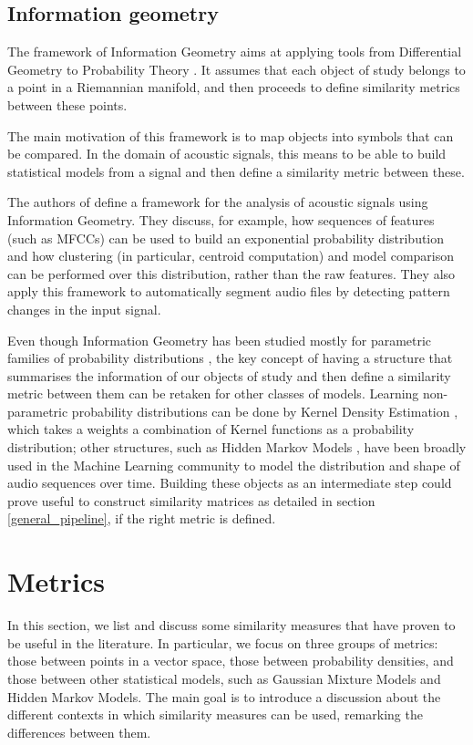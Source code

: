 \documentclass[../main.tex]{subfiles} \label{chapter_soa}
\begin{document}
\subsection{Information geometry} \label{subsection_infgeom}
The framework of Information Geometry aims at applying tools from Differential Geometry to Probability Theory \cite{Wang2009}. It assumes that each object of study belongs to a point in a Riemannian manifold, and then proceeds to define similarity metrics between these points.
\par The main motivation of this framework is to map objects into symbols that can be compared. In the domain of acoustic signals, this means to be able to build statistical models from a signal and then define a similarity metric between these.
\par The authors of \cite{Cont2011} define a framework for the analysis of acoustic signals using Information Geometry. They discuss, for example, how sequences of features (such as MFCCs) can be used to build an exponential probability distribution and how clustering (in particular, centroid computation) and model comparison can be performed over this distribution, rather than the raw features. They also apply this framework to automatically segment audio files by detecting pattern changes in the input signal.
\par Even though Information Geometry has been studied mostly for parametric families of probability distributions \cite{Amari2001}, the key concept of having a structure that summarises the information of our objects of study and then define a similarity metric between them can be retaken for other classes of models. Learning non-parametric probability distributions can be done by Kernel Density Estimation \cite{Goodall2008}, which takes a weights a combination of Kernel functions as a probability distribution; other structures, such as Hidden Markov Models \cite{Chou2008,Muda2010,Hsieh2009,Wielgat2012}, have been broadly used in the Machine Learning community to model the distribution and shape of audio sequences over time. Building these objects as an intermediate step could prove useful to construct similarity matrices as detailed in section \ref{general_pipeline}, if the right metric is defined.

\section{Metrics}\label{metrics_review}
In this section, we list and discuss some similarity measures that have proven to be useful in the literature. In particular, we focus on three groups of metrics: those between points in a vector space, those between probability densities, and those between other statistical models, such as Gaussian Mixture Models and Hidden Markov Models. The main goal is to introduce a discussion about the different contexts in which similarity measures can be used, remarking the differences between them.
\end{document}
